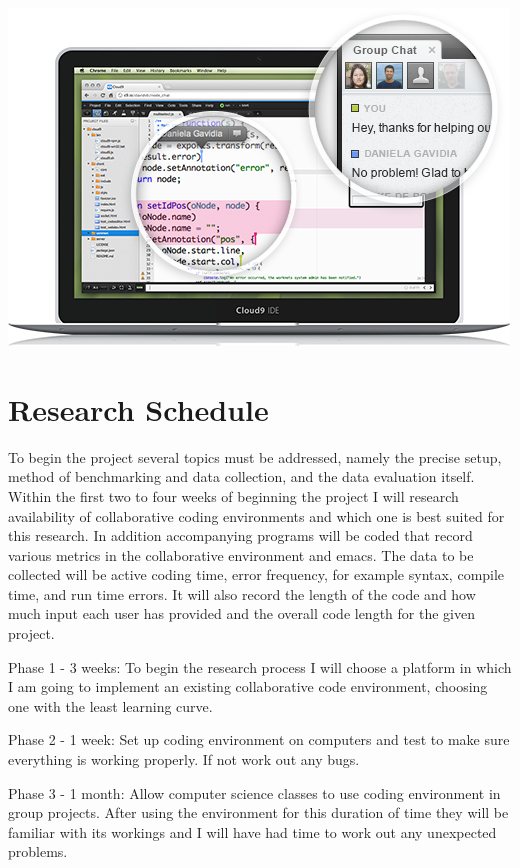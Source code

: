 \documentclass[11pt]{article}
\begin{document}
\includegraphics[scale=.5]{collab-feature}

\vspace*{-.1in}
\section{Research Schedule}
\label{sec:schedule}
\vspace*{-.1in}

To begin the project several topics must be addressed, namely the precise setup, method of benchmarking and data collection, and the data evaluation itself. Within the first two to four weeks of beginning the project I will research availability of collaborative coding environments and which one is best suited for this research. In addition accompanying programs will be coded that record various metrics in the collaborative environment and emacs. The data to be collected will be active coding time, error frequency, for example syntax, compile time, and run time errors. It will also record the length of the code and how much input each user has provided and the overall code length for the given project.

Phase 1 - 3 weeks: To begin the research process I will choose a platform in which I am going to implement an existing collaborative code environment, choosing one with the least learning curve.

Phase 2 - 1 week: Set up coding environment on computers and test to make sure everything is working properly. If not work out any bugs.

Phase 3 - 1 month: Allow computer science classes to use coding environment in group projects. After using the environment for this duration of time they will be familiar with its workings and I will have had time to work out any unexpected problems.
\end{document}

